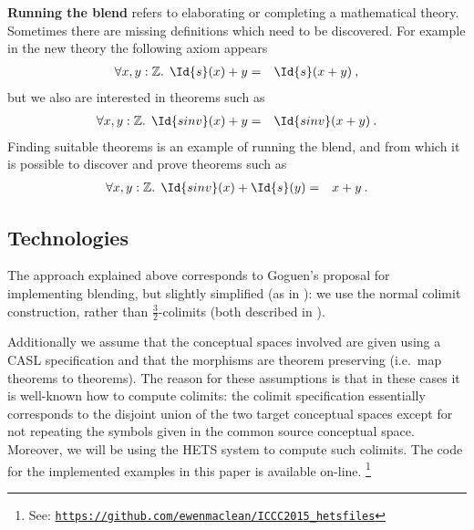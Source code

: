{\bf Running the blend} refers to elaborating or completing a
mathematical theory. Sometimes there are missing definitions which
need to be discovered. For example in the new theory 
the following axiom appears
\begin{eqnarray*}
  \forall x,y:\mathbb{Z}. \:\: \Id{s}(x) + y &=& \Id{s}(x+y) \:,
\end{eqnarray*}
but we also are interested in theorems such as
\begin{eqnarray*}
  \forall x,y:\mathbb{Z}. \:\: \Id{sinv} (x) + y &=& \Id{sinv} (x+y) \:.
\end{eqnarray*}
Finding suitable theorems is an example of running the blend, and from which it
is possible to discover and prove 
theorems such as
\begin{eqnarray*}
  \forall x,y:\mathbb{Z}. \:\: \Id{sinv}(x) + \Id{s}(y) &=& x+y \:.
\end{eqnarray*}

\subsection{Technologies}

The approach explained above corresponds to Goguen's
proposal \parencite{Gog99} for implementing blending, but slightly
simplified %
(as in \textcite{KuMoNeCo14}): 
we use
the normal colimit construction, rather than $\frac{3}{2}$-colimits
(both described in \textcite{Gog99}).


Additionally we assume that the conceptual spaces involved are %
given using a CASL specification \parencite{astesiano2002casl} and that the
morphisms are theorem preserving (i.e.\ map theorems to theorems).
The reason for these assumptions is that in these cases
it is well-known how to compute %
colimits: the colimit
specification essentially corresponds to the disjoint union of the two
target conceptual spaces except for not repeating the symbols given in
the common source conceptual space.  Moreover, we will be using the
HETS system \parencite{MossakowskiEA06} to compute such colimits.
The code for the implemented examples in this paper
is available on-line.%
\footnote{See: \texttt{\url{https://github.com/ewenmaclean/ICCC2015_hetsfiles}}}

